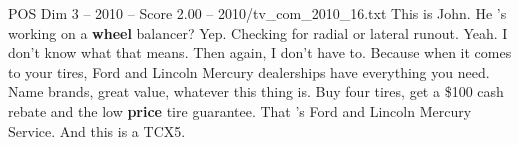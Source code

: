 \begin{textsample}{POS Dim 3 – 2010 – Score 2.00 – 2010/tv\_com\_2010\_16.txt}  \label{ex:f3_pos_043}
This is John.
He 's working on a \textbf{wheel} balancer?
Yep.
Checking for radial or lateral runout.
Yeah.
I don't know what that means.
Then again, I don't have to.
Because when it comes to your tires, Ford and Lincoln Mercury dealerships have everything you need.
Name brands, great value, whatever this thing is.
Buy four tires, get a \$100 cash rebate and the low \textbf{price} tire guarantee.
That 's Ford and Lincoln Mercury Service.
And this is a TCX5.

\end{textsample}
